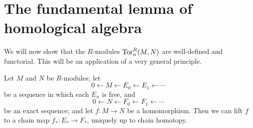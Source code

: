 \section{The fundamental lemma of homological algebra}

We will now show that the $R$-modules $\operatorname{Tor}^R_n(M,N)$ are well-defined 
and functorial. This will be an application of a very general principle.
\begin{theorem}
Let $M$ and $N$ be $R$-modules; let
\[
0\leftarrow M\leftarrow E_0\leftarrow E_1\leftarrow\cdots
\]
be a sequence in which each $E_n$ is free, and 
\[
0\leftarrow N\leftarrow F_0\leftarrow F_1\leftarrow\cdots
\]
be an exact sequence; and let $f:M\to N$ be a homomorphism.
Then we can lift $f$ to a chain map $f_*:E_*\to F_*$, uniquely up to chain
homotopy.
\end{theorem}
